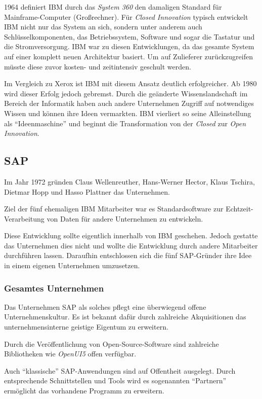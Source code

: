 1964 definiert IBM durch das \textit{System 360} den damaligen Standard für Mainframe-Computer (Großrechner).
Für \textit{Closed Innovation} typisch entwickelt IBM nicht nur das System an sich,
sondern unter anderem auch Schlüsselkomponenten, das Betriebssystem, Software und sogar die Tastatur und die Stromversorgung.
IBM war zu diesen Entwicklungen, da das gesamte System auf einer komplett neuen Architektur basiert.
Um auf Zulieferer zurückzugreifen müsste diese zuvor kosten- und zeitintensiv geschult werden.

Im Vergleich zu Xerox ist IBM mit diesem Ansatz deutlich erfolgreicher.
Ab 1980 wird dieser Erfolg jedoch gebremst.
Durch die geänderte Wissenslandschaft im Bereich der Informatik haben auch andere Unternehmen
Zugriff auf notwendiges Wissen und können ihre Ideen vermarkten.
IBM vierliert so seine Alleinstellung als \enquote{Ideenmaschine}
und beginnt die Transformation von der \textit{Closed} zur \textit{Open Innovation}.


\subsection{SAP}\label{sec:beispiele-sap}
Im Jahr 1972 gründen Claus Wellenreuther, Hans-Werner Hector, Klaus Tschira, Dietmar Hopp und Hasso Plattner das Unternehmen.

Ziel der fünf ehemaligen IBM Mitarbeiter war es
Standardsoftware zur Echtzeit-Verarbeitung von Daten für andere Unternehmen zu entwickeln.

Diese Entwicklung sollte eigentlich innerhalb von IBM geschehen.
Jedoch gestatte das Unternehmen dies nicht und wollte die Entwicklung durch andere Mitarbeiter durchführen lassen.
Daraufhin entschlossen sich die fünf SAP-Gründer ihre Idee in einem eigenen Unternehmen umzusetzen. \cite{SAPCompa72:online}

\subsubsection{Gesamtes Unternehmen}\label{sec:beispiele-sap-gesamt}
Das Unternehmen SAP als solches pflegt eine überwiegend offene Unternehmenskultur.
Es ist bekannt dafür durch zahlreiche Akquisitionen das unternehmensinterne geistige Eigentum zu erweitern.

Durch die Veröffentlichung von Open-Source-Software sind zahlreiche Bibliotheken wie \textit{OpenUI5} offen verfügbar.

Auch \enquote{klassische} SAP-Anwendungen sind auf Offentheit ausgelegt.
Durch entsprechende Schnittstellen und Tools wird es sogenannten \enquote{Partnern}
ermöglicht das vorhandene Programm zu erweitern.

